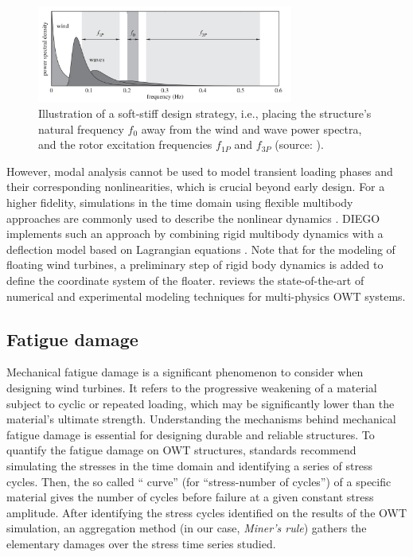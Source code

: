 \begin{figure}
    \centering
    \includegraphics[width=0.75\textwidth]{./part1/figures/modal_analysis.png}
    \caption{Illustration of a soft-stiff design strategy, i.e., placing the structure's natural frequency $f_0$ away from the wind and wave power spectra, and the rotor excitation frequencies $f_{1P}$ and $f_{3P}$ (source: \citealp{kallehave_2015_modal}).}
    \label{fig:modal_analysis}
\end{figure}

However, modal analysis cannot be used to model transient loading phases and their corresponding nonlinearities, which is crucial beyond early design. 
For a higher fidelity, simulations in the time domain using flexible multibody approaches are commonly used to describe the nonlinear dynamics \citep{holm_2009_multibody,alsolihat_2018_flexible_multibody}. 
DIEGO implements such an approach by combining rigid multibody dynamics with a deflection model based on Lagrangian equations \citep{milano_thesis_2021}. 
Note that for the modeling of floating wind turbines, a preliminary step of rigid body dynamics is added to define the coordinate system of the floater. 
\citet{otter_2022_owt_modeling_review} reviews the state-of-the-art of numerical and experimental modeling techniques for multi-physics OWT systems. 


\subsection{Fatigue damage}\label{sec:235}

Mechanical fatigue damage is a significant phenomenon to consider when designing wind turbines. 
It refers to the progressive weakening of a material subject to cyclic or repeated loading, which may be significantly lower than the material's ultimate strength. 
Understanding the mechanisms behind mechanical fatigue damage is essential for designing durable and reliable structures. 
To quantify the fatigue damage on OWT structures, standards \citep{dnv_fatigue_2016} recommend simulating the stresses in the time domain and identifying a series of stress cycles. 
Then, the so called `` curve'' (for ``stress-number of cycles'') of a specific material gives the number of cycles before failure at a given constant stress amplitude. 
After identifying the stress cycles identified on the results of the OWT simulation, an aggregation method (in our case, \textit{Miner's rule}) gathers the elementary damages over the stress time series studied. 


